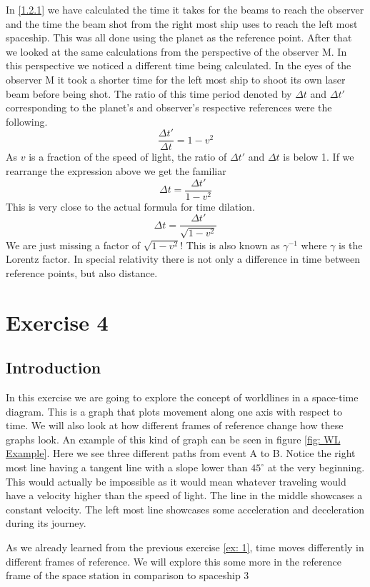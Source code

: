 \documentclass[reprint,english,notitlepage]{revtex4-2}
\begin{document}
  In \ref{1.2.1} we have calculated the time it takes for the beams to reach the observer and the time the beam shot from the right most ship uses to reach the left most spaceship. This was all done using the planet as the reference point. After that we looked at the same calculations from the perspective of the observer M. In this perspective we noticed a different time being calculated. In the eyes of the observer M it took a shorter time for the left most ship to shoot its own laser beam before being shot.
  The ratio of this time period denoted by $ Δt $ and $ Δt' $ corresponding to the planet's and observer's respective references were the following.
  \[
  \frac{Δt'}{Δt} = 1 - v^{2}
  \]
  As $ v $ is a fraction of the speed of light, the ratio of $ Δt' $ and $ Δt $ is below 1. If we rearrange the expression above we get the familiar 
  \[
  Δt = \frac{Δt'}{1 - v^{2}}
  \]
  This is very close to the actual formula for time dilation. 
  \[
  Δt = \frac{Δt'}{\sqrt{1 - v^{2}} }
  \]
  We are just missing a factor of $ \sqrt{1 - v^{2}}  $! This is also known as $ γ^{-1} $ where $ γ $ is the Lorentz factor. In special relativity there is not only a difference in time between reference points, but also distance.


\section{Exercise 4}

  \subsection{Introduction}
  In this exercise we are going to explore the concept of worldlines in a space-time diagram. This is a graph that plots movement along one axis with respect to time. We will also look at how different frames of reference change how these graphs look. An example of this kind of graph can be seen in figure \ref{fig: WL Example}. Here we see three different paths from event A to B. Notice the right most line having a tangent line with a slope lower than $ 45^{∘} $ at the very beginning. This would actually be impossible as it would mean whatever traveling would have a velocity higher than the speed of light. The line in the middle showcases a constant velocity. The left most line showcases some acceleration and deceleration during its journey. 
  
  As we already learned from the previous exercise \ref{ex: 1}, time moves differently in different frames of reference. We will explore this some more in the reference frame of the space station in comparison to spaceship 3
  
\end{document}
